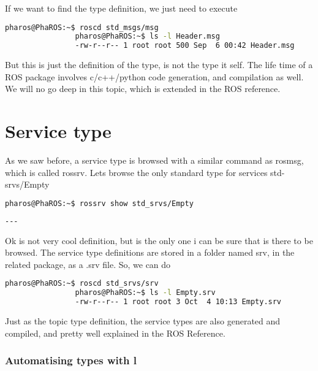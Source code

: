 \documentclass[a4paper,10pt,twoside]{book}
\begin{document}
		 			If we want to find the type definition, we just need to execute
					
			\begin{lstlisting}[language=bash,title={ Browsing Topic types }]
				pharos@PhaROS:~$ roscd std_msgs/msg
				pharos@PhaROS:~$ ls -l Header.msg
				-rw-r--r-- 1 root root 500 Sep  6 00:42 Header.msg
			\end{lstlisting}
			
					But this is just the definition of the type, is not the type it self. The life time of a ROS package involves c/c++/python code generation, and compilation as well. 
					We will no go deep in this topic, which is extended in the ROS reference. \cite{REF}
					
				
				\section{Service type}
				
				
					As we saw before, a service type is browsed with a similar command as rosmsg, which is called rossrv. Lets browse the only standard type for services std-srvs/Empty
					
			\begin{lstlisting}[language=bash,title={ Browsing service types }]
				pharos@PhaROS:~$ rossrv show std_srvs/Empty
			\end{lstlisting}
			
			
			 \begin{lstlisting}[language=bash,title={ std-srvs/Empty definition }]
				---
			\end{lstlisting}
					
					Ok is not very cool definition, but is the only one i can be sure that is there to be browsed.
					The service type definitions are stored in a folder named srv, in the related package, as a .srv file. So, we can do
					
			\begin{lstlisting}[language=bash,title={ Browsing Service types }]
				pharos@PhaROS:~$ roscd std_srvs/srv
				pharos@PhaROS:~$ ls -l Empty.srv
				-rw-r--r-- 1 root root 3 Oct  4 10:13 Empty.srv
			\end{lstlisting}
				
				
					Just as the topic type definition, the service types are also generated and compiled, and pretty well explained in the ROS Reference. 
					
			\subsubsection{ Automatising types with \installationTool{}l }
				
\end{document}

